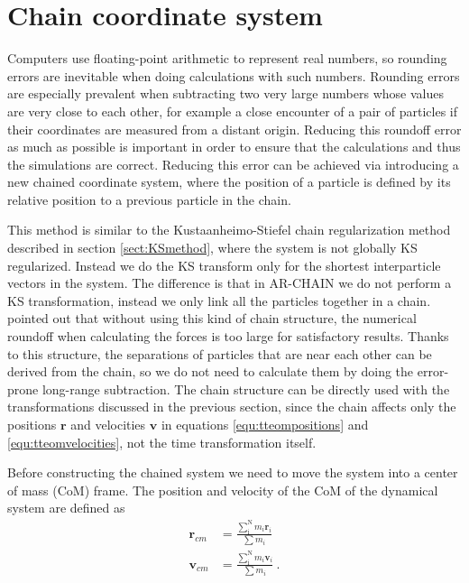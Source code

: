 \documentclass[english, oneside]{HYgradu}
\begin{document}
\section{Chain coordinate system} \label{sect:ChainSystem}

Computers use floating-point arithmetic to represent real numbers, so rounding errors are inevitable when doing calculations with such numbers. Rounding errors are especially prevalent when subtracting two very large numbers whose values are very close to each other, for example a close encounter of a pair of particles if their coordinates are measured from a distant origin. Reducing this roundoff error as much as possible is important in order to ensure that the calculations and thus the simulations are correct. Reducing this error can be achieved via introducing a new chained coordinate system, where the position of a particle is defined by its relative position to a previous particle in the chain.

This method is similar to the Kustaanheimo-Stiefel chain regularization method \citep{mikkola:1993} described in section \ref{sect:KSmethod}, where the system is not globally KS regularized. Instead we do the KS transform only for the shortest interparticle vectors in the system. The difference is that in AR-CHAIN we do not perform a KS transformation, instead we only link all the particles together in a chain. \cite{mikkola:1999} pointed out that without using this kind of chain structure, the numerical roundoff when calculating the forces is too large for satisfactory results. Thanks to this structure, the separations of particles that are near each other can be derived from the chain, so we do not need to calculate them by doing the error-prone long-range subtraction.
The chain structure can be directly used with the transformations discussed in the previous section, since the chain affects only the positions $\boldsymbol{r}$ and velocities $\boldsymbol{v}$ in equations \ref{equ:tteompositions} and \ref{equ:tteomvelocities}, not the time transformation itself.

Before constructing the chained system we need to move the system into a center of mass (CoM) frame. The position and velocity of the CoM of the dynamical system are defined as
\begin{equation}
\begin{aligned}
\boldsymbol{r}_{cm} &= \frac{\sum_\mathrm{i}^\mathrm{N} m_i \boldsymbol{r}_i}{\sum m_i} \\
\boldsymbol{v}_{cm} &= \frac{\sum_\mathrm{i}^\mathrm{N} m_i \boldsymbol{v}_i}{\sum m_i} \ .
\end{aligned}
\end{equation}
\end{document}
